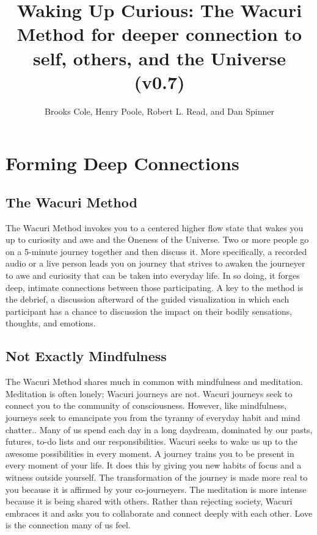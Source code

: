 \documentclass[12pt]{book}
\begin{document}
\title{Waking Up Curious: The Wacuri Method for deeper connection to self, others, and the Universe (v0.7)}

\author{Brooks Cole, Henry Poole, Robert L. Read, and Dan Spinner}
\date{ }

\maketitle
\tableofcontents


\chapter{Forming Deep Connections}

\section{The Wacuri Method}

The Wacuri Method invokes  you  to a centered higher flow state that wakes you up to curiosity and awe and the Oneness of the Universe. Two or more people go on a 5-minute journey together and then discuss it. More specifically,  a recorded audio or a live person leads you on  journey that strives to awaken the journeyer to awe and curiosity that can be taken into everyday life. In so doing, it forges deep, intimate connections between those participating. A key to the method is the debrief, a discussion afterward of the guided visualization in which each participant has a chance to discussion the impact on their bodily sensations, thoughts, and emotions.


\section{Not Exactly Mindfulness}

The Wacuri Method shares much in common with mindfulness and meditation. Meditation is often lonely; Wacuri journeys are not. Wacuri journeys seek to connect you to the community of consciousness. However, like mindfulness, journeys seek to emancipate you from the tyranny of everyday habit and mind chatter.. Many of us spend each day in a long daydream, dominated by our pasts, futures, to-do lists and our responsibilities. Wacuri seeks to wake us up to the awesome possibilities in every moment. A journey trains you to be present in every moment of your life. It does this by giving you new habits of focus and a witness outside yourself. The transformation of the journey is made more real to you because it is affirmed by your co-journeyers. The meditation is more intense because it is being shared with others. Rather than rejecting society, Wacuri embraces it and asks you to collaborate  and connect deeply with each other. Love is	 the connection many of us feel.
\end{document}
